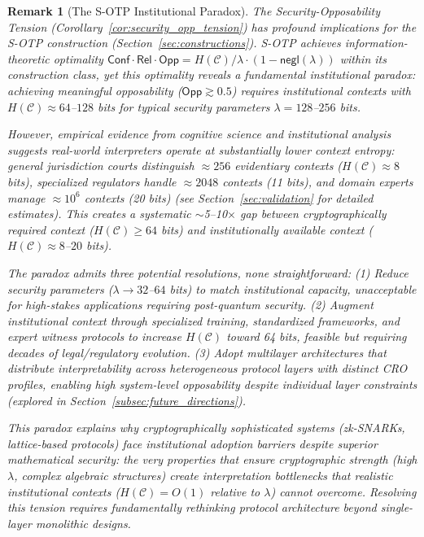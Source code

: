 \documentclass{ieeeaccess}
\newtheorem{remark}{Remark}[subsection]
\begin{document}
\begin{remark}[The S-OTP Institutional Paradox]
The Security-Opposability Tension (Corollary~\ref{cor:security_opp_tension}) has profound implications for the S-OTP construction (Section~\ref{sec:constructions}). S-OTP achieves information-theoretic optimality $\mathsf{Conf} \cdot \mathsf{Rel} \cdot \mathsf{Opp} = H(\mathcal{C})/\lambda \cdot (1-\mathsf{negl}(\lambda))$ within its construction class, yet this optimality reveals a fundamental institutional paradox: achieving meaningful opposability ($\mathsf{Opp} \gtrsim 0.5$) requires institutional contexts with $H(\mathcal{C}) \approx 64$--$128$ bits for typical security parameters $\lambda = 128$--$256$ bits.

However, empirical evidence from cognitive science and institutional analysis suggests real-world interpreters operate at substantially lower context entropy: general jurisdiction courts distinguish $\approx 256$ evidentiary contexts ($H(\mathcal{C}) \approx 8$ bits), specialized regulators handle $\approx 2048$ contexts (11 bits), and domain experts manage $\approx 10^6$ contexts (20 bits) (see Section~\ref{sec:validation} for detailed estimates). This creates a systematic $\sim$5--10$\times$ gap between cryptographically required context ($H(\mathcal{C}) \geq 64$ bits) and institutionally available context ($H(\mathcal{C}) \approx 8$--$20$ bits).

The paradox admits three potential resolutions, none straightforward: (1) \emph{Reduce security parameters} ($\lambda \to 32$--$64$ bits) to match institutional capacity, unacceptable for high-stakes applications requiring post-quantum security. (2) \emph{Augment institutional context} through specialized training, standardized frameworks, and expert witness protocols to increase $H(\mathcal{C})$ toward 64 bits, feasible but requiring decades of legal/regulatory evolution. (3) \emph{Adopt multilayer architectures} that distribute interpretability across heterogeneous protocol layers with distinct CRO profiles, enabling high system-level opposability despite individual layer constraints (explored in Section~\ref{subsec:future_directions}).

This paradox explains why cryptographically sophisticated systems (zk-SNARKs, lattice-based protocols) face institutional adoption barriers despite superior mathematical security: the very properties that ensure cryptographic strength (high $\lambda$, complex algebraic structures) create interpretation bottlenecks that realistic institutional contexts ($H(\mathcal{C}) = O(1)$ relative to $\lambda$) cannot overcome. Resolving this tension requires fundamentally rethinking protocol architecture beyond single-layer monolithic designs.
\end{remark}
\end{document}
